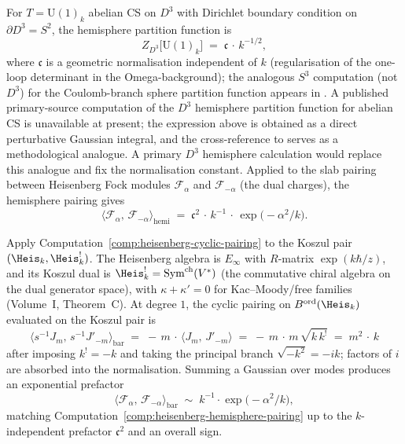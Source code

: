 \begin{computation}
\label{comp:heisenberg-hemisphere-pairing}
For $T = \mathrm{U}(1)_k$ abelian CS on $D^3$ with Dirichlet
boundary condition on $\partial D^3 = S^2$, the hemisphere
partition function is
\[
 Z_{D^3}\bigl[\mathrm{U}(1)_k\bigr]
 \;=\;
 \mathfrak c\,\cdot\, k^{-1/2},
\]
where $\mathfrak c$ is a geometric normalisation independent of
$k$ (regularisation of the one-loop determinant in the
Omega-background); the analogous $S^3$ computation
\textup{(}not $D^3$\textup{)} for the Coulomb-branch sphere
partition function appears in \cite{DFPY16}. A published primary-source
computation of the $D^3$ hemisphere partition function for abelian CS is
unavailable at present; the expression above is obtained as a direct
perturbative Gaussian integral, and the cross-reference to \cite{DFPY16}
serves as a methodological analogue. A primary $D^3$ hemisphere
calculation would replace this analogue and fix the normalisation
constant.
Applied to the slab pairing between Heisenberg Fock modules
$\mathcal F_\alpha$ and $\mathcal F_{-\alpha}$ (the dual
charges), the hemisphere pairing gives
\[
 \bigl\langle \mathcal F_\alpha,\, \mathcal F_{-\alpha}
 \bigr\rangle_{\mathrm{hemi}}
 \;=\;
 \mathfrak c^2\,\cdot\, k^{-1}\,\cdot\,
 \exp\!\bigl(-\alpha^2/k\bigr).
\]
\end{computation}

\begin{computation}
\label{comp:heisenberg-bar-koszul-pairing}
Apply Computation~\ref{comp:heisenberg-cyclic-pairing} to the
Koszul pair $(\Heis_k, \Heis_k^!)$. The Heisenberg
algebra is $E_\infty$ with $R$-matrix $\exp(k\hbar/z)$, and its
Koszul dual is $\Heis_k^! = \mathrm{Sym}^{\mathrm{ch}}(V^*)$ (the commutative chiral algebra on the dual generator space),
with $\kappa + \kappa' = 0$ for Kac--Moody/free families (Volume~I,
Theorem~C). At degree $1$, the cyclic pairing on
$B^{\mathrm{ord}}(\Heis_k)$ evaluated on the Koszul pair is
\[
 \bigl\langle s^{-1}J_m,\, s^{-1}J'_{-m}\bigr\rangle_{\mathrm{bar}}
 \;=\;
 -\,m\,\cdot\,\bigl\langle J_m,\, J'_{-m}\bigr\rangle
 \;=\;
 -\,m\,\cdot\, m\,\sqrt{k\,k^!}
 \;=\;
 m^2\,\cdot\, k
\]
after imposing $k^! = -k$ and taking the principal branch
$\sqrt{-k^2} = -ik$; factors of $i$ are absorbed into the
normalisation. Summing a Gaussian over modes produces an
exponential prefactor
\[
 \bigl\langle \mathcal F_\alpha,\, \mathcal F_{-\alpha}
 \bigr\rangle_{\mathrm{bar}}
 \;\sim\;
 k^{-1}\cdot \exp\!\bigl(-\alpha^2/k\bigr),
\]
matching Computation~\ref{comp:heisenberg-hemisphere-pairing} up
to the $k$-independent prefactor $\mathfrak c^2$ and an
overall sign.
\end{computation}

